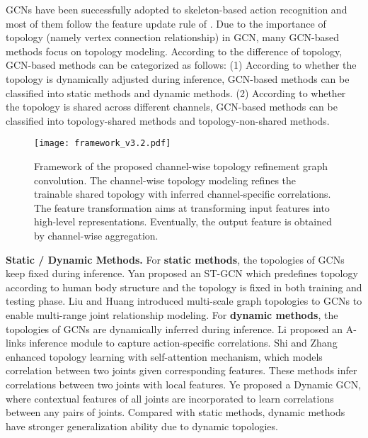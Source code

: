 \documentclass[10pt,twocolumn,letterpaper]{article}
\begin{document}
GCNs have been successfully adopted to skeleton-based action recognition \cite{liu2020disentangling,shi2019two,yan2018spatial,ye2020dynamic,zhao2019bayesian,tang2018deep} and most of them follow the feature update rule of \cite{kipf2016semi}. Due to the importance of topology (namely vertex connection relationship) in GCN, many GCN-based methods focus on topology modeling. According to the difference of topology, GCN-based methods can be categorized as follows: (1) According to whether the topology is dynamically adjusted during inference, GCN-based methods can be classified into static methods and dynamic methods. (2) According to whether the topology is shared across different channels, GCN-based methods can be classified into topology-shared methods and topology-non-shared methods.
\begin{figure*}[t]
	\centering
	\texttt{[image: framework\_v3.2.pdf]} \caption{Framework of the proposed channel-wise topology refinement graph convolution. The channel-wise topology modeling refines the trainable shared topology with inferred channel-specific correlations. The feature transformation aims at transforming input features into high-level representations. Eventually, the output feature is obtained by channel-wise aggregation.}
	\label{fig:framework}
	\vspace{-0.4cm}
\end{figure*}

\noindent \textbf{Static / Dynamic Methods.} For \textbf{static methods}, the topologies of GCNs keep fixed during inference. Yan \etal \cite{yan2018spatial} proposed an ST-GCN which predefines topology according to human body structure and the topology is fixed in both training and testing phase. Liu \etal \cite{liu2020disentangling} and Huang \etal \cite{huang2020spatio} introduced multi-scale graph topologies to GCNs to enable multi-range joint relationship modeling. For \textbf{dynamic methods}, the topologies of GCNs are dynamically inferred during inference. Li \etal \cite{li2019actional} proposed an A-links inference module to capture action-specific correlations. Shi \etal \cite{shi2019two} and Zhang \etal \cite{zhang2020semantics} enhanced topology learning with self-attention mechanism, which models correlation between two joints given corresponding features. These methods infer correlations between two joints with local features. Ye \etal \cite{ye2020dynamic} proposed a Dynamic GCN, where contextual features of all joints are incorporated to learn correlations between any pairs of joints. Compared with static methods, dynamic methods have stronger generalization ability due to dynamic topologies.
\end{document}
